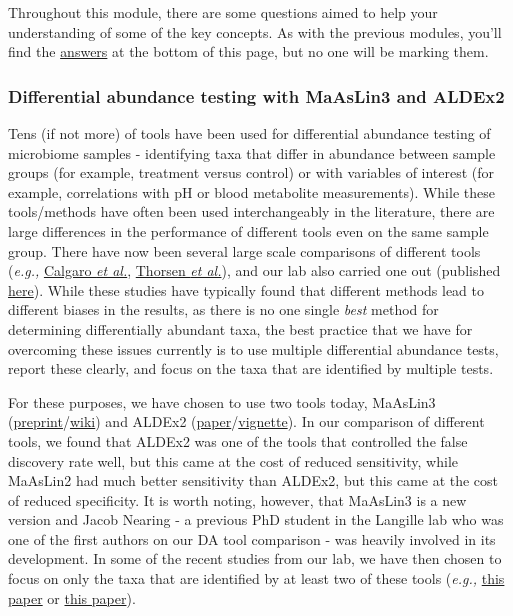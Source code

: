 \documentclass[
]{book}
\begin{document}
Throughout this module, there are some questions aimed to help your understanding of some of the key concepts. As with the previous modules, you'll find the \hyperref[answers]{answers} at the bottom of this page, but no one will be marking them.

\subsubsection{Differential abundance testing with MaAsLin3 and ALDEx2}\label{differential-abundance-testing-with-maaslin3-and-aldex2}

Tens (if not more) of tools have been used for differential abundance testing of microbiome samples - identifying taxa that differ in abundance between sample groups (for example, treatment versus control) or with variables of interest (for example, correlations with pH or blood metabolite measurements). While these tools/methods have often been used interchangeably in the literature, there are large differences in the performance of different tools even on the same sample group. There have now been several large scale comparisons of different tools (\emph{e.g.,} \href{https://link.springer.com/article/10.1186/s13059-020-02104-1}{Calgaro \emph{et al.}}, \href{https://link.springer.com/article/10.1186/s40168-016-0208-8}{Thorsen \emph{et al.}}), and our lab also carried one out (published \href{https://www.nature.com/articles/s41467-022-28034-z}{here}). While these studies have typically found that different methods lead to different biases in the results, as there is no one single \emph{best} method for determining differentially abundant taxa, the best practice that we have for overcoming these issues currently is to use multiple differential abundance tests, report these clearly, and focus on the taxa that are identified by multiple tests.

For these purposes, we have chosen to use two tools today, MaAsLin3 (\href{https://pubmed.ncbi.nlm.nih.gov/39713460/}{preprint}/\href{https://github.com/biobakery/biobakery/wiki/MaAsLin3}{wiki}) and ALDEx2 (\href{https://pmc.ncbi.nlm.nih.gov/articles/PMC4030730/}{paper}/\href{https://rdrr.io/bioc/ALDEx2/f/vignettes/ALDEx2_vignette.Rmd}{vignette}). In our comparison of different tools, we found that ALDEx2 was one of the tools that controlled the false discovery rate well, but this came at the cost of reduced sensitivity, while MaAsLin2 had much better sensitivity than ALDEx2, but this came at the cost of reduced specificity. It is worth noting, however, that MaAsLin3 is a new version and Jacob Nearing - a previous PhD student in the Langille lab who was one of the first authors on our DA tool comparison - was heavily involved in its development. In some of the recent studies from our lab, we have then chosen to focus on only the taxa that are identified by at least two of these tools (\emph{e.g.,} \href{https://microbiomejournal.biomedcentral.com/articles/10.1186/s40168-023-01662-3}{this paper} or \href{https://www.nature.com/articles/s41598-024-60409-8}{this paper}).
\end{document}
